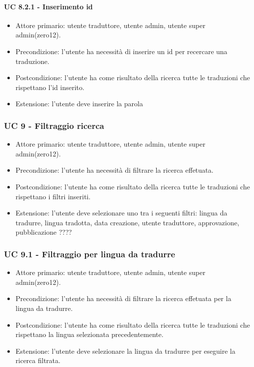         \paragraph{UC 8.2.1 - Inserimento id}
            \begin{itemize}
                \item Attore primario: utente traduttore, utente admin, utente super admin(zero12).
                \item Precondizione: l'utente ha necessità di inserire un id per recercare una traduzione.
                \item Postcondizione: l'utente ha come risultato della ricerca tutte le traduzioni che rispettano l'id inserito.
                \item Estensione: l'utente deve inserire la parola
            \end{itemize}
\subsubsection{UC 9 - Filtraggio ricerca}
    \begin{itemize}
        \item Attore primario: utente traduttore, utente admin, utente super admin(zero12).
        \item Precondizione: l'utente ha necessità di filtrare la ricerca effetuata.
        \item Postcondizione: l'utente ha come risultato della ricerca tutte le traduzioni che rispettano i filtri inseriti.
        \item Estensione: l'utente deve selezionare uno tra i seguenti filtri: lingua da tradurre, lingua tradotta, data creazione, utente traduttore, approvazione, pubblicazione  ????
    \end{itemize}
    \subsubsection{UC 9.1 - Filtraggio per lingua da tradurre}
        \begin{itemize}
            \item Attore primario: utente traduttore, utente admin, utente super admin(zero12).
            \item Precondizione: l'utente ha necessità di filtrare la ricerca effetuata per la lingua da tradurre.
            \item Postcondizione: l'utente ha come risultato della ricerca tutte le traduzioni che rispettano la lingua selezionata precedentemente. 
            \item Estensione: l'utente deve selezionare la lingua da tradurre per eseguire la ricerca filtrata.
        \end{itemize}        
